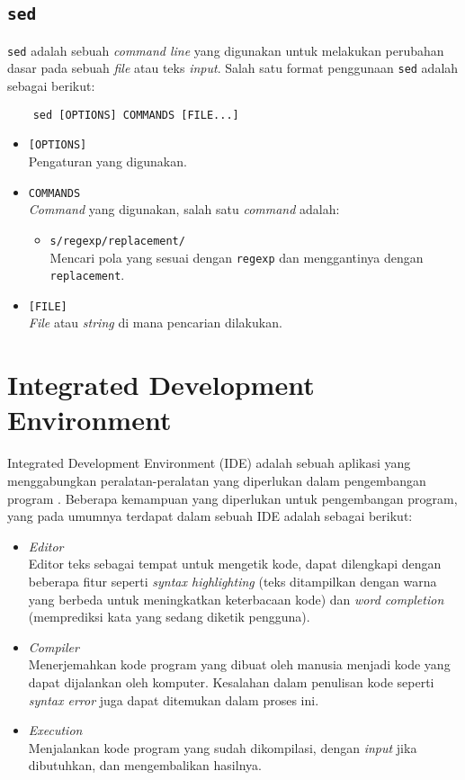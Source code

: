 \subsection{\texttt{sed}}
\verb|sed| adalah sebuah \textit{command line} yang digunakan untuk melakukan perubahan dasar pada sebuah \textit{file} atau teks \textit{input}. Salah satu format penggunaan \verb|sed| adalah sebagai berikut:
\begin{verbatim}
    sed [OPTIONS] COMMANDS [FILE...]
\end{verbatim}
\begin{itemize}
    \item \verb|[OPTIONS]| \\ Pengaturan yang digunakan.
    \item \verb|COMMANDS| \\ \textit{Command} yang digunakan, salah satu \textit{command} adalah:
    \begin{itemize}
        \item \verb|s/regexp/replacement/| \\ Mencari pola yang sesuai dengan \verb|regexp| dan menggantinya dengan \verb|replacement|.
    \end{itemize}
    \item \verb|[FILE]| \\ \textit{File} atau \textit{string} di mana pencarian dilakukan.
\end{itemize}

\section{Integrated Development Environment}
\label{sec:2:ide}

Integrated Development Environment (IDE) adalah sebuah aplikasi yang menggabungkan peralatan-peralatan yang diperlukan dalam pengembangan program \cite{ide}. Beberapa kemampuan yang diperlukan untuk pengembangan program, yang pada umumnya terdapat dalam sebuah IDE adalah sebagai berikut:
\begin{itemize}
    \item \textit{Editor} \\ Editor teks sebagai tempat untuk mengetik kode, dapat dilengkapi dengan beberapa fitur seperti \textit{syntax highlighting} (teks ditampilkan dengan warna yang berbeda untuk meningkatkan keterbacaan kode) dan \textit{word completion} (memprediksi kata yang sedang diketik pengguna).
    \item \textit{Compiler} \\ Menerjemahkan kode program yang dibuat oleh manusia menjadi kode yang dapat dijalankan oleh komputer. Kesalahan dalam penulisan kode seperti \textit{syntax error} juga dapat ditemukan dalam proses ini.
     \item \textit{Execution} \\ Menjalankan kode program yang sudah dikompilasi, dengan \textit{input} jika dibutuhkan, dan mengembalikan hasilnya. 
\end{itemize}

